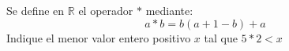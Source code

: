Se define en $\mathbb{R}$ el operador $*$ mediante:
$$
a*b=b(a+1-b)+a
$$
Indique el menor valor entero positivo $x$ tal que $5*2<x$
